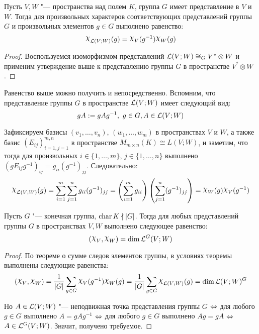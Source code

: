 \begin{corollary}
	Пусть $V, W$ "--- пространства над полем $K$, группа $G$ имеет представление в $V$ и $W$. Тогда для произвольных характеров соответствующих представлений группы $G$ и произвольных элементов $g \in G$ выполнено равенство:
	\[\Chi_{\mc L(V ; W)}(g) = \Chi_V(g^{-1})\Chi_W(g)\]
\end{corollary}

\begin{proof}
	Воспользуемся изоморфизмом представлений $\mathcal L(V; W) \cong_G V^* \otimes W$ и применим утверждение выше к представлению группы $G$ в пространстве $V^* \otimes W$.
\end{proof}

\begin{note}
	Равенство выше можно получить и непосредственно. Вспомним, что представление группы $G$ в пространстве $\mathcal L(V; W)$ имеет следующий вид:
	\[gA := gAg^{-1},~g \in G, A \in \mathcal L(V; W)\]
	
	Зафиксируем базисы $(v_1, \dotsc, v_n)$, $(w_1, \dotsc, w_m)$ в пространствах $V$ и $W$, а также базис $(E_{ij})_{i = 1, j = 1}^{m, n}$ в пространстве $M_{m \times n}(K) \cong L(V; W)$, и заметим, что тогда для произвольных $i \in \{1, \dotsc, m\}$, $j \in \{1, \dotsc, n\}$ выполнено $(gE_{ij}g^{-1})_{ij} = g_{ii}(g^{-1})_{jj}$. Следовательно:
	\[\Chi_{\mc L(V; W)}(g) = \sum_{i = 1}^{m}\sum_{j = 1}^{n}g_{ii}(g^{-1})_{jj} = \left(\sum_{i = 1}^{m}g_{ii}\right)\left(\sum_{j = 1}^{n}(g^{-1})_{jj}\right) = \Chi_W(g)\Chi_V(g^{-1})\]
\end{note}

\begin{theorem}
	Пусть $G$ "--- конечная группа, $\operatorname{char}{K} \nmid |G|$. Тогда для любых представлений группы $G$ в пространствах $V, W$ выполнено следующее равенство:
	\[(\Chi_{V}, \Chi_{W}) = \dim \mc L^G(V; W)\]
\end{theorem}

\begin{proof}
	По теореме о сумме следов элементов группы, в условиях теоремы выполнены следующие равенства:
	\[(\Chi_{V}, \Chi_{W}) = \frac1{|G|}\sum_{g \in G}\Chi_{V}(g^{-1})\Chi_{W}(g) = \frac1{|G|}\sum_{g \in G}\Chi_{\mc L(V; W)}(g) = \dim{\mc L(V; W)^G}\]
	
	Но $A \in \mathcal L(V; W)$ "--- неподвижная точка представления группы $G$ $\Leftrightarrow$ для любого $g \in G$ выполнено $A = gAg^{-1}$ $\Leftrightarrow$ для любого $g \in G$ выполнено $Ag = gA$ $\Leftrightarrow$ $A \in \mathcal L^G(V; W)$. Значит, получено требуемое.
\end{proof}


